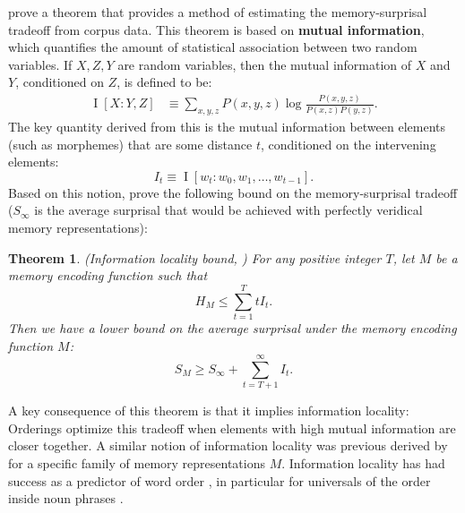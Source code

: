 \documentclass[11pt,letterpaper]{article}
\newcommand{\key}[1]{\textbf{#1}}
\newcounter{theorem}
\newtheorem{thm}[theorem]{Theorem}
\begin{document}
\citet{Hahn2020modeling} prove a theorem that provides a method of estimating the memory-surprisal tradeoff from corpus data.
This theorem is based on \key{mutual information}, which quantifies the amount of statistical association between two random variables.
If $X, Z, Y$ are random variables, then the mutual information of $X$ and $Y$, conditioned on $Z$, is defined to be:
\begin{align}
\label{eq:mi}
    \operatorname{I}[X:Y,Z] &\equiv \sum_{x,y,z} P(x,y,z) \log \frac{P(x,y,z)}{P(x,z)P(y,z)}. %
\end{align}
The key quantity derived from this is the mutual information between elements (such as morphemes) that are some distance $t$, conditioned on the intervening elements:
\begin{equation*}
    I_t \equiv \operatorname{I}[w_t : w_0 , w_1, \dots, w_{t-1}].
\end{equation*}
Based on this notion, \citet{Hahn2020modeling}  prove the following bound on the memory-surprisal tradeoff ($S_\infty$ is the average surprisal that would be achieved with perfectly veridical memory representations):
\begin{thm}\label{prop:suboptimal}(Information locality bound, \citet{Hahn2020modeling})
For any positive integer $T$, let $M$ be a memory encoding function such that
\begin{equation}
\label{eq:memory-bound}
H_M \le \sum_{t=1}^T t I_t.
\end{equation}
Then we have a lower bound on the average surprisal under the memory encoding function $M$:
\begin{equation}
\label{eq:surprisal-bound}
S_M \ge S_\infty + \sum_{t=T+1}^\infty I_t.
\end{equation}
\end{thm}


A key consequence of this theorem is that it implies information locality:
Orderings optimize this tradeoff when elements with high mutual information are closer together.
A similar notion of information locality was previous derived by \citet{futrell2020lossy} for a specific family of memory representations $M$.
Information locality has had success as a predictor of word order \citep{futrell2019information}, in particular for universals of the order inside noun phrases \citep{culbertson2020from,hahn-information-theoretic-2018,DBLP:conf/acl/FutrellDS20}.
\end{document}
